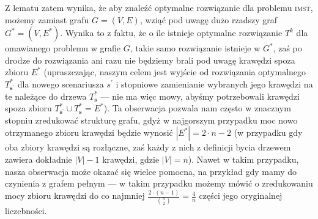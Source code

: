 Z lematu zatem wynika, że aby znaleźć optymalne rozwiązanie dla problemu \textsc{imst}, możemy zamiast grafu $G = \left( V, E \right)$, wziąć pod uwagę dużo rzadszy graf $G^{\ast} = \left( V, E^{\ast} \right)$. Wynika to z faktu, że o ile istnieje optymalne rozwiązanie $T^{k}$ dla omawianego problemu w grafie $G$, takie samo rozwiązanie istnieje w $G^{\ast}$, zaś po drodze do rozwiązania ani razu nie będziemy brali pod uwagę krawędzi spoza zbioru $E^{\ast}$ (upraszczając, naszym celem jest wyjście od rozwiązania optymalnego $T^{\ast}_{\textbf{s}^{\prime}}$ dla nowego scenariusza $s^{\prime}$ i stopniowe zamienianie wybranych jego krawędzi na te należące do drzewa $T^{\ast}_{\textbf{s}}$ --- nie ma więc mowy, abyśmy potrzebowali krawędzi spoza zbioru $T^{\ast}_{\textbf{s}^{\prime}} \cup T^{\ast}_{\textbf{s}} = E^{\ast}$). Ta obserwacja pozwala nam często w znacznym stopniu zredukować strukturę grafu, gdyż w najgorszym przypadku moc nowo otrzymanego zbioru krawędzi będzie wynosić $\left| E^{\ast} \right| = 2 \cdot n - 2$ (w przypadku gdy oba zbiory krawędzi są rozłączne, zaś każdy z nich z definicji bycia drzewem zawiera dokładnie $\left| V \right| - 1$ krawędzi, gdzie $\left| V \right| = n$). Nawet w takim przypadku, nasza obserwacja może okazać się wielce pomocna, na przykład gdy mamy do czynienia z grafem pełnym --- w takim przypadku możemy mówić o zredukowaniu mocy zbioru krawędzi do co najmniej $\frac{2 \cdot \left( n - 1 \right)}{\binom{n}{2}} = \frac{4}{n}$ części jego oryginalnej liczebności.

